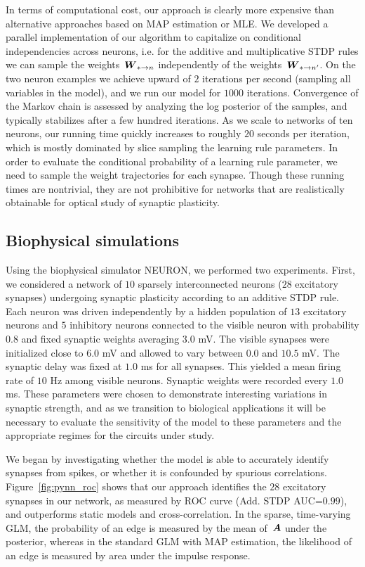 In terms of computational cost, our approach is clearly more expensive
than alternative approaches based on MAP estimation or MLE. We
developed a parallel implementation of our algorithm to capitalize on
conditional independencies across neurons, i.e. for the additive and
multiplicative STDP rules we can sample the weights~${\boldsymbol{W}_{*\to n}}$
independently of the weights~${\boldsymbol{W}_{*\to n'}}$. On the two neuron
examples we achieve upward of $2$ iterations per second (sampling all
variables in the model), and we run our model for $1000$
iterations. Convergence of the Markov chain is assessed by analyzing
the log posterior of the samples, and typically stabilizes after a few
hundred iterations. As we scale to networks of ten neurons, our
running time quickly increases to roughly $20$ seconds per iteration,
which is mostly dominated by slice sampling the learning rule
parameters. In order to evaluate the conditional probability of a
learning rule parameter, we need to sample the weight trajectories for
each synapse. Though these running times are nontrivial, they are not
prohibitive for networks that are realistically obtainable for optical
study of synaptic plasticity.

\subsection{Biophysical simulations}
Using the biophysical simulator NEURON, we performed two
experiments. First, we considered a network of $10$ sparsely
interconnected neurons ($28$ excitatory synapses) undergoing synaptic
plasticity according to an additive STDP rule. Each neuron was driven
independently by a hidden population of $13$ excitatory neurons and $5$
inhibitory neurons connected to the visible neuron with probability
$0.8$ and fixed synaptic weights averaging $3.0$ mV. The visible synapses
were initialized close to $6.0$ mV and allowed to vary between $0.0$ and
$10.5$ mV. The synaptic delay was fixed at $1.0$ ms for all synapses. This
yielded a mean firing rate of $10$ Hz among visible neurons. Synaptic
weights were recorded every $1.0$ ms.  These parameters were chosen to
demonstrate interesting variations in synaptic strength, and as we
transition to biological applications it will be necessary to evaluate
the sensitivity of the model to these parameters and the appropriate
regimes for the circuits under study.

We began by investigating whether the model is able to accurately
identify synapses from spikes, or whether it is confounded by spurious
correlations.  Figure~\ref{fig:pynn_roc} shows that our approach
identifies the $28$ excitatory synapses in our network, as measured by
ROC curve (Add. STDP AUC=${0.99}$), and
outperforms static models and cross-correlation.  In the sparse,
time-varying GLM, the probability of an edge is measured by the mean
of~$\boldsymbol{A}$ under the posterior, whereas in the standard GLM with MAP
estimation, the likelihood of an edge is measured by area under the
impulse response.

